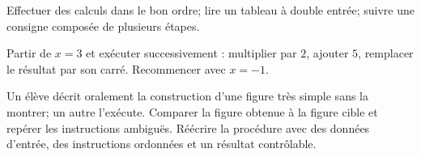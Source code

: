 \begin{prerequis}
Effectuer des calculs dans le bon ordre; lire un tableau à double entrée; suivre
une consigne composée de plusieurs étapes.
\end{prerequis}
\begin{automatismes}
Partir de $x=3$ et exécuter successivement : multiplier par $2$, ajouter $5$,
remplacer le résultat par son carré. Recommencer avec $x=-1$.
\end{automatismes}
\begin{activite}
Un élève décrit oralement la construction d'une figure très simple sans la
montrer; un autre l'exécute. Comparer la figure obtenue à la figure cible et
repérer les instructions ambiguës. Réécrire la procédure avec des données
d'entrée, des instructions ordonnées et un résultat contrôlable.
\end{activite}

